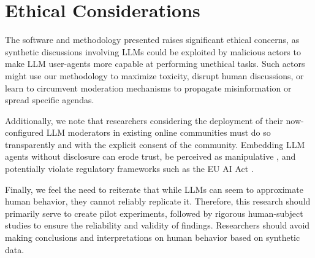 %
\section{Ethical Considerations}
\label{sec:ethical}

The software and methodology presented raises significant ethical concerns, as synthetic discussions involving \acp{LLM} could be exploited by malicious actors to make \ac{LLM} user-agents more capable at performing unethical tasks. Such actors might use our methodology to  maximize toxicity, disrupt human discussions, or learn to circumvent moderation mechanisms to propagate misinformation or spread specific agendas. 

Additionally, we note that researchers considering the deployment of their now-configured \ac{LLM} moderators in existing online communities must do so transparently and with the explicit consent of the community. Embedding \ac{LLM} agents without disclosure can erode trust, be perceived as manipulative \cite{retraction_watch}, and potentially violate regulatory frameworks such as the EU AI Act \cite{eu_ai_act_2024}.

Finally, we feel the need to reiterate that while \acp{LLM} can seem to approximate human behavior, they cannot reliably replicate it. Therefore, this research should primarily serve to create pilot experiments, followed by rigorous human-subject studies to ensure the reliability and validity of findings. Researchers should avoid making conclusions and interpretations on human behavior based on synthetic data.